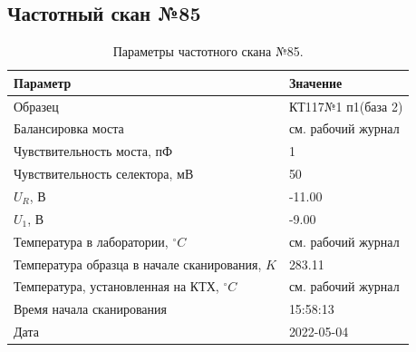 \subsection{Частотный скан №85}
\begin{table}[!ht]
    \centering
    \caption{Параметры частотного скана №85.}
    \begin{tabular}{|l|l|}
        \hline
        Параметр                                       & Значение                  \\ \hline
        Образец                                        & КТ117№1 п1(база 2)        \\ \hline
        Балансировка моста                             & см. рабочий журнал        \\ \hline
        Чувствительность моста, пФ                     & 1                         \\ \hline
        Чувствительность селектора, мВ                 & 50                        \\ \hline
        $U_R$, В                                       & -11.00                    \\ \hline
        $U_1$, В                                       & -9.00                     \\ \hline
        Температура в лаборатории, $^\circ C$          & см. рабочий журнал        \\ \hline
        Температура образца в начале сканирования, $K$ & 283.11                    \\ \hline
        Температура, установленная на КТХ, $^\circ C$  & см. рабочий журнал        \\ \hline
        Время начала сканирования                      & 15:58:13                  \\ \hline
        Дата                                           & 2022-05-04                \\ \hline
    \end{tabular}
    \label{table:frequency_scan_85}
\end{table}

